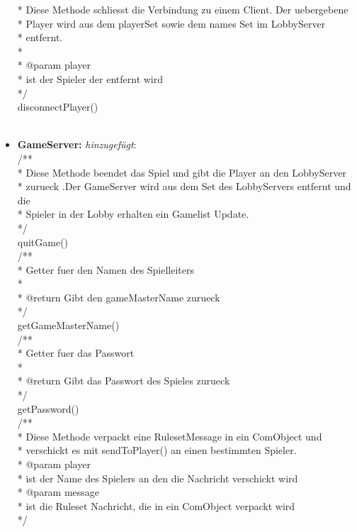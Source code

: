 \documentclass{article}
\begin{document}
\begin{itemize}
 * Diese Methode schliesst die Verbindung zu einem Client. Der uebergebene\\
 * Player wird aus dem playerSet sowie dem names Set im LobbyServer\\
 * entfernt.\\
 * \\
 * @param player\\
 *            ist der Spieler der entfernt wird\\
 */\\
disconnectPlayer()\\
\\
\item  \textbf{GameServer:} \textit{hinzugefügt}: \\
/**\\
 * Diese Methode beendet das Spiel und gibt die Player an den LobbyServer\\
 * zurueck .Der GameServer wird aus dem Set des LobbyServers entfernt und die\\
 * Spieler in der Lobby erhalten ein Gamelist Update.\\
 */\\
quitGame()\\
/**\\
 * Getter fuer den Namen des Spielleiters\\
 * \\
 * @return Gibt den gameMasterName zurueck\\
 */\\
getGameMasterName()\\
/**\\
 * Getter fuer das Passwort\\
 * \\
 * @return Gibt das Passwort des Spieles zurueck\\
 */\\
getPassword()\\
/**\\
 * Diese Methode verpackt eine RulesetMessage in ein ComObject und\\
 * verschickt es mit sendToPlayer() an einen bestimmten Spieler.\\
 * @param player\\
 *            ist der Name des Spielers an den die Nachricht verschickt wird\\
 * @param message\\
 *            ist die Ruleset Nachricht, die in ein ComObject verpackt wird\\
 */\\

\end{itemize}
\end{document}
